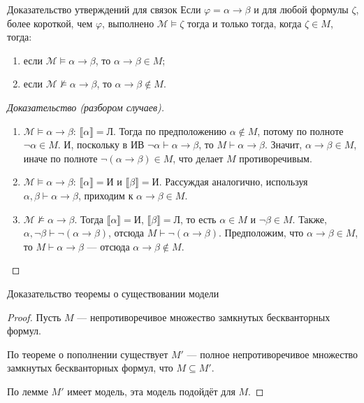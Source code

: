 \documentclass[aspectratio=169]{beamer}
\begin{document}
\begin{frame}{Доказательство утверждений для связок}
Если $\varphi = \alpha\to\beta$ и для любой формулы $\zeta$, более короткой, чем $\varphi$, выполнено
$\mathcal{M}\models\zeta$ тогда и только тогда, когда $\zeta\in M$, тогда:
\begin{enumerate}
\item если $\mathcal{M}\models\alpha\to\beta$, то $\alpha\to\beta\in M$;
\item если $\mathcal{M}\not\models\alpha\to\beta$, то $\alpha\to\beta\notin M$.
\end{enumerate}
\begin{proof}[Доказательство (разбором случаев)]
\begin{enumerate}\pause
\item $\mathcal{M}\models\alpha\to\beta$: $\llbracket\alpha\rrbracket = \text{Л}$. \pause
Тогда по предположению $\alpha\notin M$, потому по полноте
$\neg\alpha\in M$. \pause И, поскольку в ИВ $\neg\alpha\vdash\alpha\to\beta$, то $M \vdash \alpha\to\beta$. \pause
Значит, $\alpha\to\beta \in M$, иначе по полноте $\neg(\alpha\to\beta) \in M$, что делает $M$ противоречивым.\pause
\item $\mathcal{M}\models\alpha\to\beta$: $\llbracket\alpha\rrbracket = \text{И}$ и $\llbracket\beta\rrbracket = \text{И}$. Рассуждая аналогично,
используя $\alpha,\beta\vdash\alpha\to\beta$, приходим к $\alpha\to\beta \in M$.\pause
\item $\mathcal{M}\not\models\alpha\to\beta$. Тогда $\llbracket\alpha\rrbracket=\text{И}$,
$\llbracket\beta\rrbracket=\text{Л}$, \pause то есть $\alpha\in M$ и $\neg\beta\in M$. \pause
Также, $\alpha,\neg\beta\vdash\neg(\alpha\to\beta)$, отсюда $M\vdash\neg(\alpha\to\beta)$. \pause
Предположим, что $\alpha\to\beta\in M$, то $M\vdash\alpha\to\beta$ --- отсюда
$\alpha\to\beta\notin M$.
\end{enumerate}
\end{proof}
\end{frame}

\begin{frame}{Доказательство теоремы о существовании модели}
\begin{proof}
Пусть $M$ --- непротиворечивое множество замкнутых бескванторных формул.\pause

По теореме о пополнении существует $M'$ --- полное непротиворечивое множество замкнутых бескванторных формул,
что $M \subseteq M'$.\pause

По лемме $M'$ имеет модель, эта модель подойдёт для $M$.
\end{proof}
\end{frame}
\end{document}
